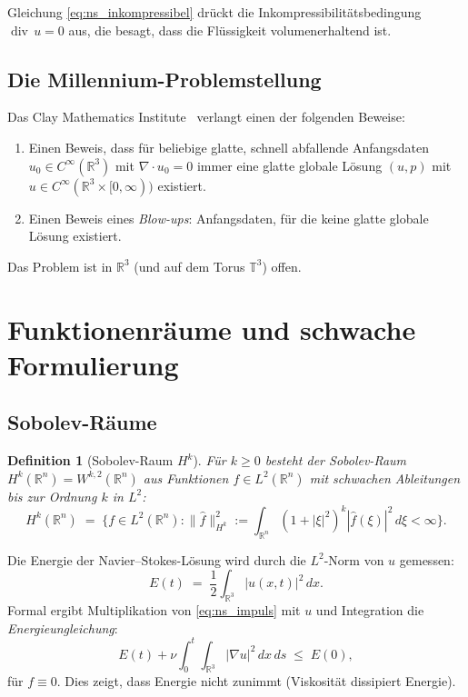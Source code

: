 \documentclass[12pt,a4paper]{article}
\newtheorem{definition}[theorem]{Definition}
\theoremstyle{remark}
\begin{document}
Gleichung \eqref{eq:ns_inkompressibel} drückt die Inkompressibilitätsbedingung
$\operatorname{div}\, u = 0$ aus, die besagt, dass die Flüssigkeit volumenerhaltend ist.

\subsection{Die Millennium-Problemstellung}

Das Clay Mathematics Institute~\cite{Clay2000} verlangt einen der folgenden Beweise:
\begin{enumerate}[nosep]
  \item Einen Beweis, dass für beliebige glatte, schnell abfallende Anfangsdaten
    $u_0 \in C^\infty(\mathbb{R}^3)$ mit $\nabla \cdot u_0 = 0$ immer eine glatte globale
    Lösung $(u, p)$ mit $u \in C^\infty(\mathbb{R}^3 \times [0,\infty))$ existiert.
  \item Einen Beweis eines \emph{Blow-ups}: Anfangsdaten, für die keine glatte globale
    Lösung existiert.
\end{enumerate}

Das Problem ist in $\mathbb{R}^3$ (und auf dem Torus $\mathbb{T}^3$) offen.

\section{Funktionenräume und schwache Formulierung}

\subsection{Sobolev-Räume}

\begin{definition}[Sobolev-Raum $H^k$]
  Für $k \geq 0$ besteht der Sobolev-Raum $H^k(\mathbb{R}^n) = W^{k,2}(\mathbb{R}^n)$
  aus Funktionen $f \in L^2(\mathbb{R}^n)$ mit schwachen Ableitungen bis zur Ordnung $k$
  in $L^2$:
  \[
    H^k(\mathbb{R}^n) \;=\; \bigl\{ f \in L^2(\mathbb{R}^n) :
    \|\hat{f}\|_{H^k}^2 := \int_{\mathbb{R}^n} (1+|\xi|^2)^k |\hat{f}(\xi)|^2\,d\xi < \infty \bigr\}.
  \]
\end{definition}

Die Energie der Navier--Stokes-Lösung wird durch die $L^2$-Norm von $u$ gemessen:
\[
  E(t) \;=\; \frac{1}{2}\int_{\mathbb{R}^3} |u(x,t)|^2\,dx.
\]
Formal ergibt Multiplikation von \eqref{eq:ns_impuls} mit $u$ und Integration die
\emph{Energieungleichung}:
\begin{equation}\label{eq:energie}
  E(t) + \nu \int_0^t \int_{\mathbb{R}^3} |\nabla u|^2\,dx\,ds \;\leq\; E(0),
\end{equation}
für $f \equiv 0$. Dies zeigt, dass Energie nicht zunimmt (Viskosität dissipiert Energie).
\end{document}
